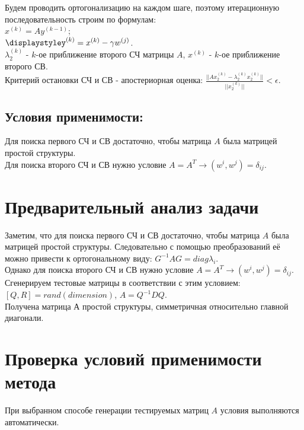 \documentclass[12pt]{article}
\begin{document}
Будем проводить ортогонализацию на каждом шаге, поэтому итерационную последовательность строим по формулам:\\
$\displaystyle x^{(k)} = A y^{(k-1)}$;\\
$\displaystyley^{(k)} = x^{(k)} - \gamma w^{(j)}$.\\
$\lambda_2^{(k)}$ - $k$-ое приближение второго СЧ матрицы $A$, $\displaystyle x^{(k)}$ - $k$-ое приближение второго СВ.\\
Критерий остановки СЧ и СВ - апостериорная оценка: $\displaystyle \frac{||Ax_2^{(k)}-\lambda_2^{(k)}x_2^{(k)}||}{||x_2^{(k)}||}< \epsilon$.
\subsection{Условия применимости:}
Для поиска первого СЧ и СВ достаточно, чтобы матрица $A$ была матрицей простой структуры.\\
Для поиска второго СЧ и СВ нужно условие $\displaystyle A = A^T \rightarrow (w^{i},w^{j}) = \delta_{ij}$.
\section{Предварительный анализ задачи}
Заметим, что для поиска первого СЧ и СВ достаточно, чтобы матрица $A$ была матрицей простой структуры. Следовательно с помощью преобразований её можно привести к ортогональному виду: $G^{-1}AG = diag\lambda_i$.\\ Однако для поиска второго СЧ и СВ нужно условие $\displaystyle A = A^T \rightarrow (w^{i},w^{j}) = \delta_{ij}$.\\
Сгенерируем тестовые матрицы в соответствии с этим условием: $[Q,R] = rand(dimension)$, $A = Q^{-1}DQ$.\\
Получена матрица $А$ простой структуры, симметричная относительно главной диагонали.\\
\section{Проверка условий применимости метода}
При выбранном способе генерации тестируемых матриц $A$ условия выполняются автоматически.
\end{document}
